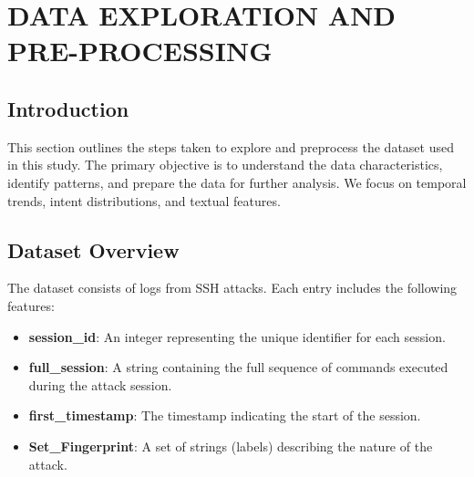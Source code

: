 

\section{DATA EXPLORATION AND PRE-PROCESSING}


    \subsection{Introduction}
        
        This section outlines the steps taken to explore and preprocess the dataset used in this study. The primary objective is to understand the data characteristics, identify patterns, and prepare the data for further analysis. We focus on temporal trends, intent distributions, and textual features.
        
    \subsection{Dataset Overview}
    
        The dataset consists of logs from SSH attacks. Each entry includes the following features:

        \begin{itemize}
            \item \textbf{session\_id}: An integer representing the unique identifier for each session.
            \item \textbf{full\_session}: A string containing the full sequence of commands executed during the attack session.
            \item \textbf{first\_timestamp}: The timestamp indicating the start of the session.
            \item \textbf{Set\_Fingerprint}: A set of strings (labels) describing the nature of the attack.
        \end{itemize}

